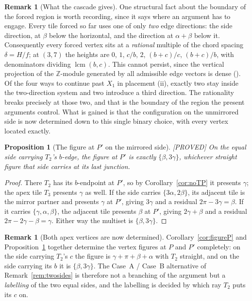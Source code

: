 \documentclass[11pt,reqno]{amsart}
\theoremstyle{plain}
\newtheorem{proposition}[theorem]{Proposition}
\theoremstyle{definition}
\newtheorem{remark}[theorem]{Remark}
\newcommand{\lab}[1]{\hfill\textnormal{\footnotesize\textsc{[#1]}}}
\begin{document}
\begin{remark}[What the cascade gives]
One structural fact about the boundary of the forced region is worth recording, since it says where an
argument has to engage. Every tile forced so far uses one of only \emph{two} edge directions: the side
direction, at $\beta$ below the horizontal, and the direction at $\alpha+\beta$ below it. Consequently
every forced vertex sits at a \emph{rational} multiple of the chord spacing $\delta=H/f$; at $(3,7)$
the heights are $0$, $1$, $c/b$, $2$, $(b+c)/c$, $(b+c)/b$, with denominators dividing
$\operatorname{lcm}(b,c)$. This cannot persist, since the vertical projection of the $\mathbb Z$-module
generated by all admissible edge vectors is dense (\cite{Obstructions}). Of the four ways to
continue past $X_1$ in placement (ii), exactly two stay inside the two-direction system and two
introduce a third direction. The rationality breaks precisely at those two, and that is the boundary
of the region the present arguments control. What is gained is that the
configuration on the unmirrored side is now determined down to this single binary choice, with every
vertex located exactly.
\end{remark}

\begin{proposition}[The figure at $P'$ on the mirrored side]\label{prop:figurePprime}\lab{PROVED}
On the equal side carrying $T_2$'s $b$-edge, the figure at $P'$ is \emph{exactly} $\{\beta,3\gamma\}$,
whichever straight figure that side carries at its last junction.
\end{proposition}

\begin{proof}
There $T_2$ has its $b$-endpoint at $P'$, so by Corollary~\ref{cor:noTP} it presents $\gamma$; the apex
tile $T_3$ presents $\gamma$ as well. If the side carries $\{3\alpha,2\beta\}$, its adjacent tile is the
mirror partner and presents $\gamma$ at $P'$, giving $3\gamma$ and a residual $2\pi-3\gamma=\beta$. If
it carries $\{\gamma,\alpha,\beta\}$, the adjacent tile presents $\beta$ at $P'$, giving
$2\gamma+\beta$ and a residual $2\pi-2\gamma-\beta=\gamma$. Either way the multiset is
$\{\beta,3\gamma\}$.
\end{proof}

\begin{remark}[Both apex vertices are now determined]\label{rem:bothdetermined}
Corollary~\ref{cor:figureP} and Proposition~\ref{prop:figurePprime} together determine the vertex
figures at $P$ and $P'$ completely: on the side carrying $T_2$'s $c$ the figure is
$\gamma+\pi+\beta+\alpha$ with $T_2$ straight, and on the side carrying its $b$ it is
$\{\beta,3\gamma\}$. The Case~A / Case~B alternative of Remark~\ref{rem:twosides} is therefore not a
branching of the argument but a \emph{labelling} of the two equal sides, and the labelling is decided
by which ray $T_2$ puts its $c$ on.
\end{remark}
\end{document}
